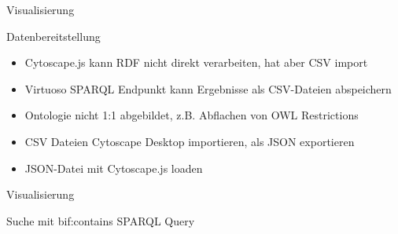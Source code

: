 \documentclass[14pt,aspectratio=1610]{beamer}
\begin{document}
\begin{frame}{Visualisierung}
\begin{block}{Datenbereitstellung}
\begin{itemize}
\item Cytoscape.js kann RDF nicht direkt verarbeiten, hat aber CSV import
\item Virtuoso SPARQL Endpunkt kann Ergebnisse als CSV-Dateien abspeichern
\item Ontologie nicht 1:1 abgebildet, z.B. Abflachen von OWL Restrictions 
\item CSV Dateien Cytoscape Desktop importieren, als JSON exportieren
\item JSON-Datei mit Cytoscape.js loaden
\end{itemize}
\end{block}
\end{frame}

\begin{frame}{Visualisierung}
\begin{block}{Suche mit bif:contains SPARQL Query}
\centering
{}
\end{block}
\end{frame}
\end{document}
